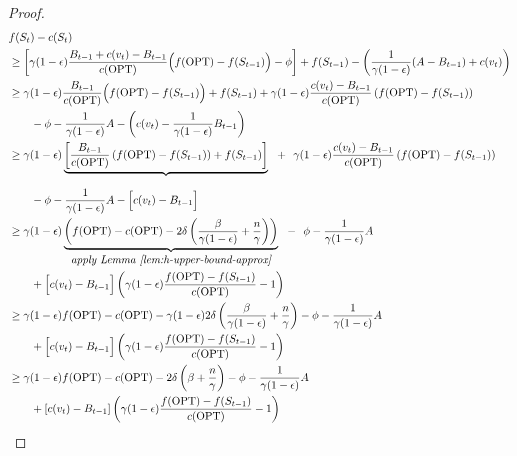 \documentclass[10pt]{article} %
\theoremstyle{remark}
\newcommand{\OPT}{{\rm OPT}}
\begin{document}
\begin{proof}
\begin{align*}
    &f(S_t)-c(S_t)\\
    &\geq \left[\gamma(1-\epsilon) \displaystyle\frac{B_{t-1}+c(v_t)-B_{t-1}}{c(\OPT)} \Big ( f(\OPT) - f(S_{t-1}) \Big ) - \phi\right]  +f(S_{t-1})- {\left(\displaystyle\frac{1}{\gamma(1-\epsilon)}(A-B_{t-1})+c(v_t)\right)}\\
    &\geq  {\gamma(1-\epsilon) \displaystyle\frac{B_{t-1}}{c(\OPT)} \Big( f(\OPT) - f(S_{t-1})\Big)}+ f(S_{t-1})    + {\gamma(1-\epsilon) \displaystyle\frac{c(v_t)-B_{t-1}}{c(\OPT)} \left( f(\OPT) - f(S_{t-1}) \right) }\\
        &\quad\quad - \phi - \displaystyle\frac{1}{\gamma(1-\epsilon)}A-\left(c(v_t)-\frac{1}{\gamma(1-\epsilon)}B_{t-1}\right)\\
    &\geq  \gamma(1-\epsilon)  \underbrace{\left[\displaystyle\frac{B_{t-1}}{c(\OPT)} \left( f(\OPT) - f(S_{t-1}) \right) + f(S_{t-1})\right]}_{} ~~+~~ \gamma(1-\epsilon) \displaystyle\frac{c(v_t)-B_{t-1}}{c(\OPT)} \left( f(\OPT) - f(S_{t-1}) \right) \\
        &\quad\quad- \phi- {\displaystyle\frac{1}{\gamma(1-\epsilon)}A-\Big[c(v_t)-B_{t-1}\Big]}\\  
    &\geq \gamma(1-\epsilon) \underbrace{\left(f(\OPT)-c(\OPT) - 2\delta\left(\frac{\beta}{\gamma(1-\epsilon)}+ \frac{n}{\gamma}\right) \right)}_{\mbox{\it apply Lemma~\ref{lem:h-upper-bound-approx}}} ~~-~~ \phi - \displaystyle\frac{1}{\gamma(1-\epsilon)}A \\
        &\quad\quad + \Big[c(v_t)-B_{t-1}\Big]\left( \gamma(1-\epsilon) \displaystyle\frac{f(\OPT) - f(S_{t-1}) }{c(\OPT)} -1 \right) \\
    &\geq \gamma(1-\epsilon) f(\OPT)-c(\OPT) - \gamma(1-\epsilon)2\delta\left(\frac{\beta}{\gamma(1-\epsilon)}+ \frac{n}{\gamma}\right)  - \phi - \displaystyle\frac{1}{\gamma(1-\epsilon)}A \\
        &\quad\quad + \Big[c(v_t)-B_{t-1}\Big]\left( \gamma(1-\epsilon) \displaystyle\frac{f(\OPT) - f(S_{t-1}) }{c(\OPT)} -1 \right) \\
    &\geq \gamma(1-\epsilon) f(\OPT)-c(\OPT) - 2\delta\left(\beta+ \frac{n}{\gamma}\right)  - \phi - \displaystyle\frac{1}{\gamma(1-\epsilon)}A \\
        &\quad\quad + \left[c(v_t)-B_{t-1}\right]\left( \gamma(1-\epsilon) \displaystyle\frac{f(\OPT) - f(S_{t-1}) }{c(\OPT)} -1 \right) 
\end{align*}



\end{proof}
\end{document}
